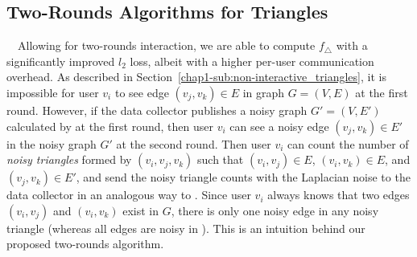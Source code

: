 
\subsection{Two-Rounds Algorithms for Triangles}
\label{chap1-sub:two_rounds}

~~Allowing for 
two-rounds interaction, 
we are able to compute $f_{\triangle}$ with
a significantly improved $l_2$ loss, albeit with a higher per-user
communication overhead.
As described in Section~\ref{chap1-sub:non-interactive_triangles}, it is impossible for user $v_i$ to see edge $(v_j, v_k) \in E$ in graph $G=(V,E)$ at the first round. 
However, if 
the data collector publishes a noisy graph $G'=(V,E')$ calculated by  at the first round, then 
user $v_i$ can see a noisy edge $(v_j, v_k) \in E'$ in the noisy graph $G'$ at the second round. 
Then user $v_i$ can count the number of \textit{noisy triangles} formed by
$(v_i, v_j, v_k)$ such that $(v_i,v_j) \in E$, $(v_i,v_k) \in E$, and $(v_j,v_k)
\in E'$, and send the noisy triangle counts with the Laplacian noise to the data
collector in an analogous way to .
Since user $v_i$ always knows that two edges $(v_i,v_j)$ and $(v_i,v_k)$ exist in $G$, 
there is only one noisy edge in any noisy triangle 
(whereas all edges are noisy in ).
This is an intuition behind our proposed two-rounds algorithm. 

